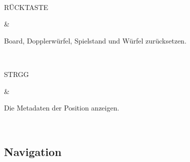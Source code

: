 \documentclass[letterpaper,10pt,german]{sphinxmanual}
\begin{document}
\begin{savenotes}
\begin{tabular}[t]{}
\\
\sphinxhline\begin{varwidth}[t]{}
\sphinxAtStartPar
RÜCKTASTE
\sphinxbeforeendvarwidth
\end{varwidth}%
&\begin{varwidth}[t]{}
\sphinxAtStartPar
Board, Dopplerwürfel, Spielstand und Würfel zurücksetzen.
\sphinxbeforeendvarwidth
\end{varwidth}%
\\
\sphinxhline\begin{varwidth}[t]{}
\sphinxAtStartPar
STRG\sphinxhyphen{}G
\sphinxbeforeendvarwidth
\end{varwidth}%
&\begin{varwidth}[t]{}
\sphinxAtStartPar
Die Metadaten der Position anzeigen.
\sphinxbeforeendvarwidth
\end{varwidth}%
\\
\sphinxbottomrule
\end{tabular}
\sphinxtableafterendhook\par
\sphinxattableend\end{savenotes}


\subsection{Navigation}
\label{\detokenize{raccourcis:navigation}}\label{\detokenize{raccourcis:raccourcis-navigation}}
\end{document}
